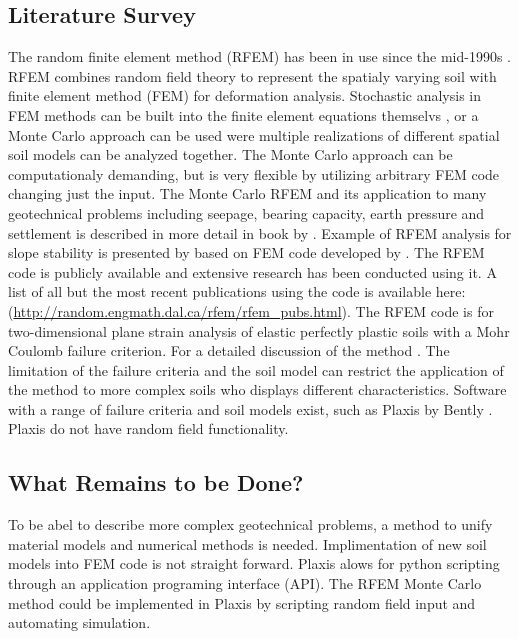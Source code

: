 \subsection*{Literature Survey}
The random finite element method (RFEM) has been in use since the mid-1990s \citep*[e.g, see][]{griffiths1993seepage}. RFEM combines random field theory to represent the spatialy varying soil with finite element method (FEM) for deformation analysis. Stochastic analysis in FEM methods can be built into the finite element equations themselvs \citep*[e.g., see][]{vanmarcke1983stochastic}, 
or a Monte Carlo approach can be used were multiple realizations of different spatial soil models can be analyzed together. The Monte Carlo approach can be computationaly demanding, but is very flexible by utilizing arbitrary FEM code changing just the input. The Monte Carlo RFEM and its application to many geotechnical problems including seepage, bearing capacity, earth pressure and settlement is described in more detail in book by \citet*{fenton2008risk}.
Example of RFEM analysis for slope stability is presented by \citep*[see][Chapter 13]{fenton2008risk} based on FEM code developed by \citet*{smith2013programming}. The RFEM code is publicly available and extensive research has been conducted using it. A list of all but the most recent publications using the code is available here: (\url{http://random.engmath.dal.ca/rfem/rfem_pubs.html}). 
The RFEM code is for two-dimensional plane strain analysis of elastic perfectly plastic soils with a Mohr Coulomb failure criterion. For a detailed discussion of the method \citep*[e.g, see][]{griffiths1999slope}.
The limitation of the failure criteria and the soil model can restrict the application of the method to more complex soils who displays different characteristics. Software with a range of failure criteria and soil models exist, such as Plaxis by Bently \citep{brinkgreve2010plaxis}. Plaxis do not have random field functionality. 



\subsection*{What Remains to be Done?}
To be abel to describe more complex geotechnical problems, a method to unify material models and numerical methods is needed. Implimentation of new soil models into FEM code is not straight forward. 
Plaxis alows for python scripting through an application programing interface (API). 
The RFEM Monte Carlo method could be implemented in Plaxis by scripting random field input and automating simulation.


